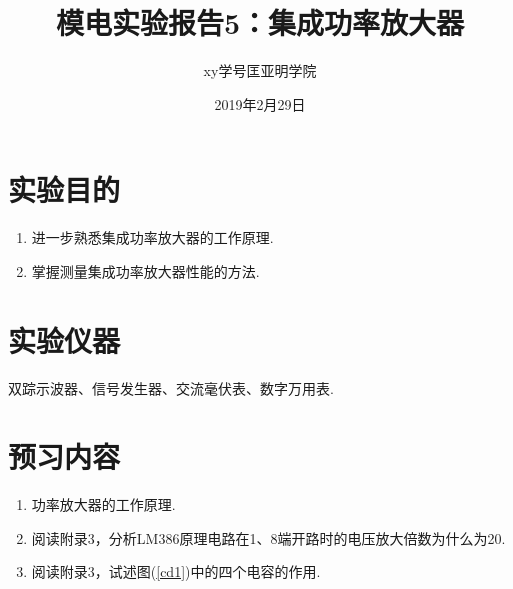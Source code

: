 \documentclass[a4paper]{article}
\title{模电实验报告5：集成功率放大器}
\author{xy\quad 学号\quad 匡亚明学院}
\date{2019年2月29日}
\begin{document}
\maketitle


\section{实验目的}
\begin{enumerate}
\item 进一步熟悉集成功率放大器的工作原理.
\item 掌握测量集成功率放大器性能的方法.
\end{enumerate}

\section{实验仪器}
双踪示波器、信号发生器、交流毫伏表、数字万用表.

\section{预习内容}
\begin{enumerate}
\item 功率放大器的工作原理.
\item 阅读附录3，分析LM386原理电路在1、8端开路时的电压放大倍数为什么为20.
\item 阅读附录3，试述图(\ref{cd1})中的四个电容的作用.
\end{enumerate}
\end{document}
